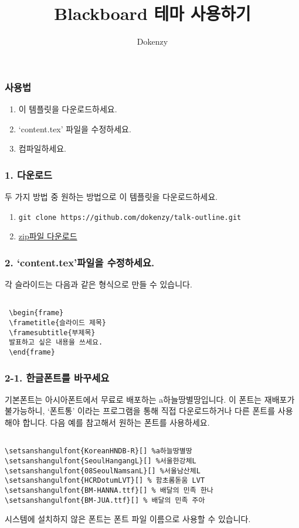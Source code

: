 



\author{Dokenzy}
\date{\vspace{-1em}}
\title{Blackboard 테마 사용하기}


\maketitle

\begin{frame}[fragile]
\frametitle{사용법}
\begin{enumerate}
\item 이 템플릿을 다운로드하세요.
\item `content.tex' 파일을 수정하세요.
\item 컴파일하세요.
\end{enumerate}
\end{frame}


\begin{frame}[fragile]
\frametitle{1. 다운로드}
두 가지 방법 중 원하는 방법으로 이 템플릿을 다운로드하세요.
\begin{enumerate}
\item \lstinline|git clone https://github.com/dokenzy/talk-outline.git|
\item \href{https://github.com/dokenzy/talk-outline/archive/master.zip}{zip파일 다운로드}
\end{enumerate}
\end{frame}


\begin{frame}[fragile]
\frametitle{2. `content.tex'파일을 수정하세요.}
각 슬라이드는 다음과 같은 형식으로 만들 수 있습니다.
\begin{lstlisting}

 \begin{frame}
 \frametitle{슬라이드 제목}
 \framesubtitle{부제목}
 발표하고 싶은 내용을 쓰세요.
 \end{frame}

\end{lstlisting}
\end{frame}


\begin{frame}[fragile]
\frametitle{2-1. 한글폰트를 바꾸세요}
기본폰트는 아시아폰트에서 무료로 배포하는 a하늘땅별땅입니다. 이 폰트는 재배포가 불가능하니, `폰트통' 이라는 프로그램을 통해 직접 다운로드하거나 다른 폰트를 사용해야 합니다. 다음 예를 참고해서 원하는 폰트를 사용하세요.
\begin{lstlisting}

\setsanshangulfont{KoreanHNDB-R}[] %a하늘땅별땅
\setsanshangulfont{SeoulHangangL}[] %서울한강체L
\setsanshangulfont{08SeoulNamsanL}[] %서울남산체L
\setsanshangulfont{HCRDotumLVT}[] % 함초롬돋움 LVT
\setsanshangulfont{BM-HANNA.ttf}[] % 배달의 민족 한나
\setsanshangulfont{BM-JUA.ttf}[] % 배달의 민족 주아

\end{lstlisting}
시스템에 설치하지 않은 폰트는 폰트 파일 이름으로 사용할 수 있습니다.
\end{frame}



